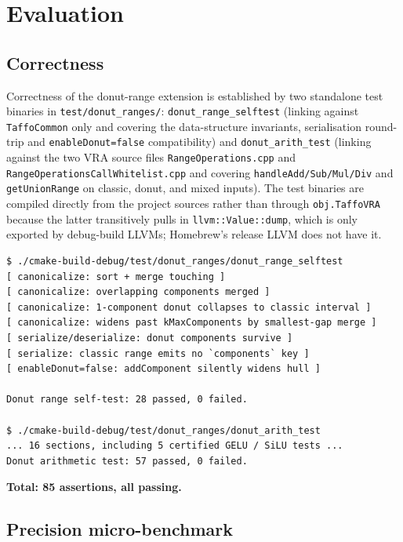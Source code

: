 \documentclass[11pt,a4paper]{article}
\theoremstyle{plain}
\begin{document}
\section{Evaluation}
\label{sec:eval}

\subsection{Correctness}
\label{sec:eval-correct}

Correctness of the donut-range extension is established by two
standalone test binaries in \texttt{test/donut\_ranges/}:
\texttt{donut\_range\_selftest} (linking against \texttt{TaffoCommon}
only and covering the data-structure invariants, serialisation
round-trip and \texttt{enableDonut=false} compatibility) and
\texttt{donut\_arith\_test} (linking against the two VRA source files
\texttt{RangeOperations.cpp} and \texttt{RangeOperationsCallWhitelist.cpp}
and covering \texttt{handleAdd/Sub/Mul/Div} and \texttt{getUnionRange}
on classic, donut, and mixed inputs). The test binaries are compiled
directly from the project sources rather than through
\texttt{obj.TaffoVRA} because the latter transitively pulls in
\texttt{llvm::Value::dump}, which is only exported by debug-build LLVMs;
Homebrew's release LLVM does not have it.

\begin{lstlisting}[style=shell,caption={Actual output on an Apple Silicon MacBook Pro, Homebrew LLVM 18.}]
$ ./cmake-build-debug/test/donut_ranges/donut_range_selftest
[ canonicalize: sort + merge touching ]
[ canonicalize: overlapping components merged ]
[ canonicalize: 1-component donut collapses to classic interval ]
[ canonicalize: widens past kMaxComponents by smallest-gap merge ]
[ serialize/deserialize: donut components survive ]
[ serialize: classic range emits no `components` key ]
[ enableDonut=false: addComponent silently widens hull ]

Donut range self-test: 28 passed, 0 failed.

$ ./cmake-build-debug/test/donut_ranges/donut_arith_test
... 16 sections, including 5 certified GELU / SiLU tests ...
Donut arithmetic test: 57 passed, 0 failed.
\end{lstlisting}

\textbf{Total: 85 assertions, all passing.}

\subsection{Precision micro-benchmark}
\label{sec:micro}
\end{document}
